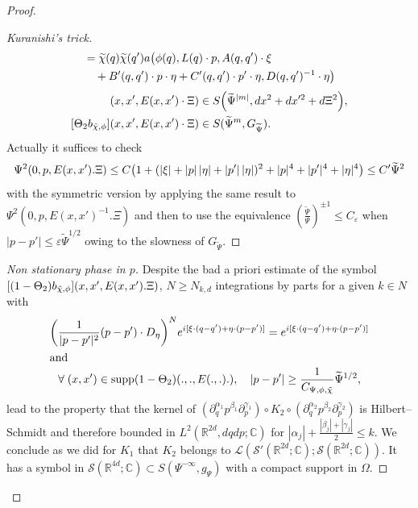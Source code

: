 \documentclass[10pt]{amsart}
\theoremstyle{definition}\newtheorem{defi}[theo]{Definition}\newtheorem{rema}[theo]{Remark}\newtheorem{exam}[theo]{Example}\newtheorem{exem}[theo]{Example}\newtheorem{nota}[theo]{Notation}
\newcommand{\C}{\mathbb{C}}
\newcommand{\R}{\mathbb{R}}
\newcommand{\clS}{\mathcal{S}}
\newcommand{\clL}{\mathcal{L}}
\DeclareMathOperator{\suppp}{supp}
\let\oldtilde\tilde
\renewcommand*{\tilde}[1]{\mathchoice{\widetilde{#1}}{\widetilde{#1}}{\oldtilde{#1}}{\oldtilde{#1}}}
\let\oldforall\forall
\renewcommand*{\forall}{\mathrel{\oldforall}}
\let\originalleft\left
\let\originalright\right
\renewcommand{\left}{\mathopen{}\mathclose\bgroup\originalleft}
\renewcommand{\right}{\aftergroup\egroup\originalright}
\begin{document}
\begin{proof}
\begin{proof}[{Kuranishi's trick}]
\begin{align*}
&=\tilde\chi(q)\tilde\chi(q')a\bigl(\phi(q),L(q)\cdot p,A(q,q')\cdot\xi\\
&\quad+B'(q,q')\cdot p\cdot\eta
+C'(q,q')\cdot p'\cdot\eta,D(q,q')^{-1}
\cdot\eta\bigr)
\end{align*}
\begin{align*}
[(1-\Theta_{2})b_{\tilde\chi,\phi}](x,x',E(x,x')\cdot\Xi)&\in S\left(\widetilde{\Psi}^{|m|},dx^{2}+dx'^{2}+d\Xi^{2}\right),\\
[\Theta_{2}b_{\tilde\chi,\phi}](x,x',E(x,x')\cdot\Xi)&\in S(\widetilde{\Psi}^{m},G_{\widetilde{\Psi}}).
\end{align*}
Actually it suffices to check
\[
\Psi^{2}(0,p,E(x,x').\Xi)\leq C\left(1+(|\xi|+|p|\,|\eta|+|p'|\,|\eta|)^{2}+|p|^{4}+|p'|^{4}+|\eta|^{4}\right)\leq C'\widetilde{\Psi}^{2}
\]
with the symmetric version by applying the same result to $\Psi^{2}(0,p,E(x,x')^{-1}.\Xi)$ and then to use the equivalence $(\frac{\widetilde{\Psi}}{\Psi})^{\pm 1}\leq C_{\varepsilon}$ when $|p-p'|\leq \varepsilon \widetilde{\Psi}^{1/2}$ owing to the slowness of $G_{\widetilde{\Psi}}$.
\let\qed\relax
\end{proof}


\begin{proof}[{Non stationary phase in $p$}]
Despite the bad a priori estimate of the symbol $[(1-\Theta_{2})b_{\tilde\chi,\phi}](x,x',E(x,x').\Xi)$, $N\geq N_{k,d}$ integrations by parts for a given $k\in N$ with
\begin{gather*}
\left(\frac{1}{|p-p'|^{2}}(p-p')\cdot D_{\eta}\right)^{N}e^{i[\xi\cdot(q-q')+\eta\cdot(p-p')]}= e^{i[\xi\cdot(q-q')+\eta\cdot(p-p')]}\\
\intertext{and}
\forall (x,x')\in \suppp(1-\Theta_{2})(.,.,E(.,.).),\quad |p-p'|\geq \frac{1}{C_{\Psi,\phi,\tilde\chi}}\widetilde{\Psi}^{1/2},
\end{gather*}
lead to the property that the kernel of $(\partial_{q}^{\alpha_{1}}p^{\beta_{1}}\partial_{p}^{\gamma_{1}})\circ K_{2}\circ(\partial_{q}^{\alpha_{2}}p^{\beta_{2}}\partial_{p}^{\gamma_{2}})$ is Hilbert--Schmidt and therefore bounded in $L^{2}(\R^{2d},dqdp;\C)$ for $|\alpha_{j}|+\frac{|\beta_{j}|+|\gamma_{j}|}{2}\leq k$. We conclude as we did for $K_{1}$ that $K_{2}$ belongs to $\clL(\clS'(\R^{2d};\C);\clS(\R^{2d};\C))$. It has a symbol in $\clS(\R^{4d};\C)\subset S(\Psi^{-\infty},g_{\Psi})$ with a compact support in $\Omega$.
\let\qed\relax
\end{proof}


\end{proof}
\end{document}
